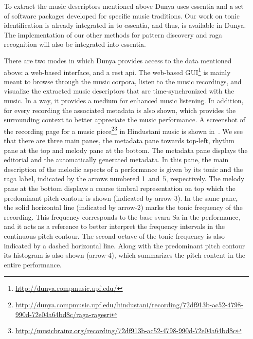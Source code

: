 To extract the music descriptors mentioned above Dunya uses \gls{essentia} and a set of software packages developed for specific music traditions. Our work on tonic identification is already integrated in to \gls{essentia}, and thus, is available in Dunya. The implementation of our other methods for pattern discovery and \gls{raga} recognition will also be integrated into \gls{essentia}. 

There are two modes in which Dunya provides access to the data mentioned above: a web-based interface, and a \acrshort{rest} \acrshort{api}. The web-based GUI\footnote{\url{http://dunya.compmusic.upf.edu/}} is mainly meant to browse through the music corpora, listen to the music recordings, and visualize the extracted music descriptors that are time-synchronized with the music. In a way, it provides a medium for enhanced music listening. In addition, for every recording the associated metadata is also shown, which provides the surrounding context to better appreciate the music performance. A screenshot of the recording page for a music piece\footnote{\url{http://dunya.compmusic.upf.edu/hindustani/recording/72df913b-ac52-4798-990d-72e04a64bd8c/raga-ragesri}}\footnote{\url{http://musicbrainz.org/recording/72df913b-ac52-4798-990d-72e04a64bd8c}} in Hindustani music is shown in~. We see that there are three main panes, the metadata pane towards top-left, rhythm pane at the top and melody pane at the bottom. The metadata pane displays the editorial and the automatically generated metadata. In this pane, the main description of the melodic aspects of a performance is given by its tonic and the \gls{raga} label, indicated by the arrows numbered 1~and~5, respectively. The melody pane at the bottom displays a coarse timbral representation on top which the predominant pitch contour is shown (indicated by arrow-3). In the same pane, the solid horizontal line (indicated by arrow-2) marks the tonic frequency of the recording. This frequency corresponds to the base \gls{svara} Sa in the performance, and it acts as a reference to better interpret the frequency intervals in the continuous pitch contour. The second octave of the tonic frequency is also indicated by a dashed horizontal line. Along with the predominant pitch contour its histogram is also shown (arrow-4), which summarizes the pitch content in the entire performance. 

